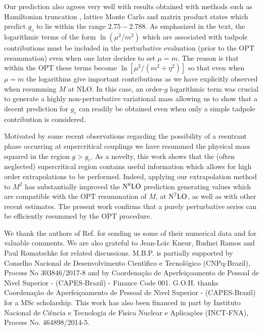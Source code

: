 \documentclass[a4paper,11pt]{article}
\begin{document}
Our prediction also agrees very well with results obtained with methods such as Hamiltonian truncation \cite{hamilton1, hamilton3, hamilton7}, lattice Monte Carlo \cite{lattice5, lattice1} and matrix product states \cite {lattice2} which predict $g_c$ to lie within the range $ 2.75 - 2.788$.  As   emphasized in the text, the logarithmic terms of the form $\ln (\mu^2/m^2)$ which are associated with tadpole contributions  must be included in the perturbative evaluation (prior to the OPT resummation) even when one later decides to set $\mu=m$. The reason is that within the OPT these terms become $\ln [\mu^2/(m^2+\eta^2)]$ so that even when $\mu=m$ the logarithms give important contributions as we have explicitly observed when resumming $M$ at  NLO. In this case, an order-$g$ logarithmic term was crucial to generate a highly non-perturbative variational mass allowing us to show that a decent prediction for $g_c$ can readily be obtained even when only a simple tadpole contribution is considered.  

Motivated by some recent observations \cite {serone4} regarding the possibility of a reentrant phase occurring at supercritical couplings we have resummed the physical mass squared in the region $g>g_c$.  As a novelty, this work  shows that the (often neglected)  supercritical region contains useful information which allows for high order extrapolations  to be performed.  Indeed, applying our extrapolation method to $M^2$ has substantially improved the  ${\rm N}^8{\rm LO}$ prediction generating values which are compatible with the OPT resummation of $M$, at ${\rm N}^7{\rm LO}$, as well as with other recent estimates. The present work confirms that a purely perturbative series can be efficiently resummed by the OPT procedure. 





 
 

\acknowledgments
We thank the authors of Ref. \cite{serone1} for sending us some of their numerical data and for valuable comments. We are also grateful to  Jean-Lo\"{\i}c Kneur, Rudnei Ramos and Paul Romatschke   for related discussions. M.B.P. is  partially supported by Conselho Nacional de Desenvolvimento Cient\'{\i}fico e Tecnol\'{o}gico (CNPq-Brazil), Process No 303846/2017-8 and by Coordena\c c\~{a}o  de Aperfei\c coamento de Pessoal de  N\'{\i}vel Superior - (CAPES-Brazil)  -
Finance  Code  001. G.O.H. thanks Coordena\c c\~{a}o  de Aperfei\c coamento de Pessoal de  N\'{\i}vel Superior - (CAPES-Brazil) for a MSc scholarship.
This work has also been financed  in  part  by  Instituto  Nacional  de  Ci\^encia  e Tecnologia de F\'{\i}sica Nuclear e Aplica\c c\~{o}es  (INCT-FNA), Process No.  464898/2014-5.
 
\end{document}
